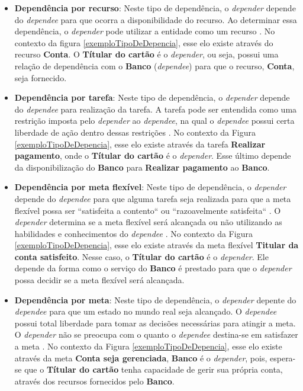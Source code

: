 \begin{itemize}
	
	\item \textbf{Dependência por recurso}: Neste tipo de dependência, o \textit{depender} depende do \textit{dependee} para que ocorra a disponibilidade do recurso. Ao determinar essa dependência, o \textit{depender} pode utilizar a entidade como um recurso \cite{istarwiki20}. No contexto da figura \ref{exemploTipoDeDepencia}, esse elo existe através do recurso \textbf{Conta}. O \textbf{Títular do cartão} é o \textit{depender}, ou seja, possui uma relação de dependência com o \textbf{Banco} (\textit{dependee}) para que o recurso, \textbf{Conta}, seja fornecido.
	
	\item \textbf{Dependência por tarefa}: Neste tipo de dependência, o \textit{depender} depende do \textit{dependee} para realização da tarefa. A tarefa pode ser entendida como uma restrição imposta pelo \textit{depender} ao \textit{dependee}, na qual o \textit{dependee} possui certa liberdade de ação dentro dessas restrições \cite{istarwiki20}. No contexto da Figura \ref{exemploTipoDeDepencia}, esse elo existe através da tarefa \textbf{Realizar pagamento}, onde o \textbf{Títular do cartão} é o \textit{depender}. Esse último depende da disponibilização do \textbf{Banco} para \textbf{Realizar pagamento} ao \textbf{Banco}. 
	
	\item \textbf{Dependência por meta flexível}: Neste tipo de dependência, o \textit{depender} depende do \textit{dependee} para que alguma tarefa seja realizada para que a meta flexível possa ser ``satisfeita a contento`` ou ``razoavelmente satisfeita`` \cite{istarwiki20}. O \textit{depender} determina se a meta flexível será alcançada ou não utilizando as habilidades e conhecimentos do \textit{dependee} \cite{napolitano2009estrategia}. No contexto da Figura \ref{exemploTipoDeDepencia}, esse elo existe através da meta flexível \textbf{Titular da conta satisfeito}. Nesse caso, o \textbf{Títular do cartão} é o \textit{depender}. Ele depende da forma como o serviço do \textbf{Banco} é prestado para que o \textit{depender} possa decidir se a meta flexível será alcançada.
	
	\item \textbf{Dependência por meta}: Neste tipo de dependência, o \textit{depender} depente do \textit{dependee} para que um estado no mundo real seja alcançado. O \textit{dependee} possui total liberdade para tomar as decisões necessárias para atingir a meta. O \textit{depender} não se preocupa com o quanto o \textit{dependee} destina-se em satisfazer a meta \cite{istarwiki20}. No contexto da Figura \ref{exemploTipoDeDepencia}, esse elo existe através da meta \textbf{Conta seja gerenciada},  \textbf{Banco} é o \textit{depender}, pois, espera-se que o \textbf{Títular do cartão} tenha capacidade de gerir sua própria conta, através dos recursos fornecidos pelo \textbf{Banco}. 
	
\end{itemize}

